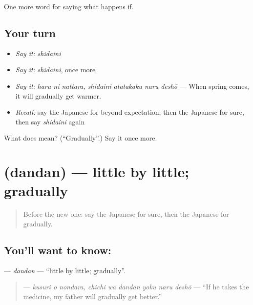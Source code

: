 \begin{grammarlens}[title={What you've built}]
One more word for saying what happens if.
\end{grammarlens}

\subsection*{Your turn}
\begin{itemize}
\raggedright
  \item \emph{Say it:} \emph{shidaini}
  \item \emph{Say it:} \emph{shidaini}, once more
  \item \emph{Say it:} \emph{haru ni nattara, shidaini atatakaku naru deshō} — When spring comes, it will gradually get warmer.
  \item \emph{Recall:} say the Japanese for beyond expectation, then the Japanese for sure, then say \emph{shidaini} again
\end{itemize}

\begin{tcolorbox}[breakable,colback=teal!4,colframe=teal!35!black,title={Before you move on}]
What does  mean? (\textquotedblleft{}Gradually\textquotedblright{}.) Say it once more.
\end{tcolorbox}
\section[\texorpdfstring{\ja{だんだん} (dandan)}{だんだん (dandan)}]{ (dandan) — little by little; gradually}

\label{lesson:JA-C521-dandan}



\begin{quote}
Before the new one: say the Japanese for sure, then the Japanese for gradually.
\end{quote}

\subsection*{You'll want to know: }
\textbf{} — \emph{dandan} — \textquotedblleft{}little by little; gradually\textquotedblright{}.

\begin{quote}
\textbf{    } — \emph{kusuri o nondara, chichi wa dandan yoku naru deshō} — \textquotedblleft{}If he takes the medicine, my father will gradually get better.\textquotedblright{}
\end{quote}

